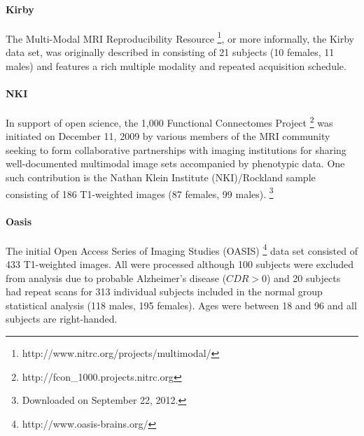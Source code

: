 \paragraph{Kirby}
The Multi-Modal MRI Reproducibility Resource%
\footnote{
http://www.nitrc.org/projects/multimodal/
}, 
or more informally, the Kirby
data set, was originally described in \cite{landman2011} consisting of 
21 subjects (10 females, 11 males) and features a rich multiple modality and 
repeated acquisition schedule.

\paragraph{NKI}
In support of open science, the 1,000 Functional Connectomes Project%
\footnote{ 
http://fcon\_1000.projects.nitrc.org
}
was initiated on December 11, 2009 by various members of the MRI community
seeking to form collaborative partnerships with imaging institutions for 
sharing well-documented multimodal image sets accompanied by phenotypic data.
One such contribution is the Nathan Klein Institute (NKI)/Rockland sample
consisting of 186 T1-weighted
images (87 females, 99 males).%
\footnote{
Downloaded on September 22, 2012.
}

\paragraph{Oasis}
The initial Open Access Series of Imaging Studies (OASIS)%
\footnote{
http://www.oasis-brains.org/
}
data set consisted of 433 T1-weighted images.  All were processed
although 100 subjects were excluded from analysis due to probable Alzheimer's
disease ($CDR > 0$) and 20 subjects had repeat scans
for 313 individual subjects included in the normal group statistical
analysis (118 males, 195 females).
Ages were between 18 and 96 and  
all subjects are right-handed.  


